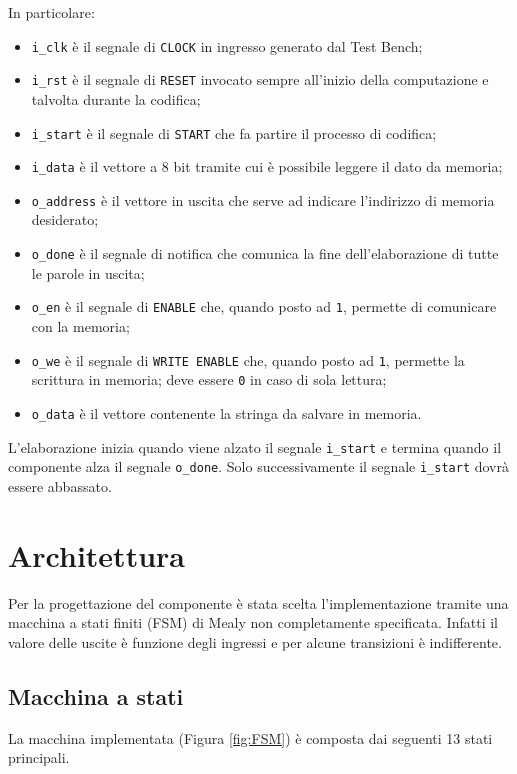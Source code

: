 \documentclass{article}
\begin{document}
In particolare:
\vspace{3.5pt}
\begin{itemize}
    \item \verb|i_clk| è il segnale di \verb|CLOCK| in ingresso generato dal Test Bench;
    \item \verb|i_rst| è il segnale di \verb|RESET| invocato sempre all'inizio della computazione e talvolta durante la codifica;
    \item \verb|i_start| è il segnale di \verb|START| che fa partire il processo di codifica;
    \item \verb|i_data| è il vettore a 8 bit tramite cui è possibile leggere il dato da memoria;
    \item \verb|o_address| è il vettore in uscita che serve ad indicare l'indirizzo di memoria desiderato;
    \item \verb|o_done| è il segnale di notifica che comunica la fine dell’elaborazione di tutte le parole in uscita;
    \item \verb|o_en| è il segnale di \verb|ENABLE| che, quando posto ad \verb|1|, permette di comunicare con la memoria;
    \item \verb|o_we| è il segnale di \verb|WRITE ENABLE| che, quando posto ad \verb|1|, permette la scrittura in memoria; deve essere \verb|0| in caso di sola lettura;
    \item \verb|o_data| è il vettore contenente la stringa da salvare in memoria.
\end{itemize}
\vspace{10pt}
L’elaborazione inizia quando viene alzato il segnale \verb|i_start| e termina quando il componente alza il segnale \verb|o_done|. Solo successivamente il segnale \verb|i_start| dovrà essere abbassato.





\newpage
\section{Architettura}
Per la progettazione del componente è stata scelta l'implementazione tramite una macchina a stati finiti (FSM) di Mealy non completamente specificata. Infatti il valore delle uscite è funzione degli ingressi e per alcune transizioni è indifferente.

\subsection{Macchina a stati}
La macchina implementata (Figura \ref{fig:FSM}) è composta dai seguenti 13 stati principali.
\end{document}
